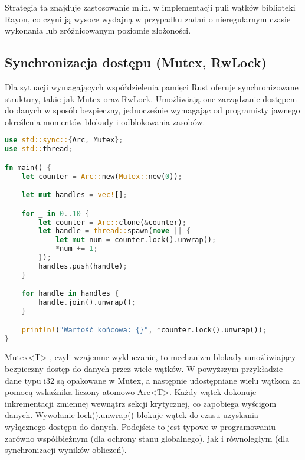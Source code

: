 Strategia ta znajduje zastosowanie m.in. w implementacji puli wątków biblioteki Rayon, co czyni ją wysoce wydajną w przypadku zadań o nieregularnym czasie wykonania lub zróżnicowanym poziomie złożoności.

\subsection{Synchronizacja dostępu (Mutex, RwLock)}
Dla sytuacji wymagających współdzielenia pamięci Rust oferuje synchronizowane struktury, takie jak Mutex  oraz RwLock. Umożliwiają one zarządzanie dostępem do danych w sposób bezpieczny, jednocześnie wymagając od programisty jawnego określenia momentów blokady i odblokowania zasobów.

\begin{lstlisting}[language=Rust, caption=Przykład użycia Mutex, label=mutex_example]
use std::sync::{Arc, Mutex};
use std::thread;

fn main() {
    let counter = Arc::new(Mutex::new(0));

    let mut handles = vec![];

    for _ in 0..10 {
        let counter = Arc::clone(&counter);
        let handle = thread::spawn(move || {
            let mut num = counter.lock().unwrap();
            *num += 1;
        });
        handles.push(handle);
    }

    for handle in handles {
        handle.join().unwrap();
    }

    println!("Wartość końcowa: {}", *counter.lock().unwrap());
}
\end{lstlisting}
Mutex<T> , czyli wzajemne wykluczanie, to mechanizm blokady umożliwiający bezpieczny dostęp do danych przez wiele wątków. W powyższym przykładzie dane typu i32 są opakowane w Mutex, a następnie udostępniane wielu wątkom za pomocą wskaźnika liczony atomowo Arc<T>. Każdy wątek dokonuje inkrementacji zmiennej wewnątrz sekcji krytycznej, co zapobiega wyścigom danych. Wywołanie lock().unwrap() blokuje wątek do czasu uzyskania wyłącznego dostępu do danych. Podejście to jest typowe w programowaniu zarówno współbieżnym (dla ochrony stanu globalnego), jak i równoległym (dla synchronizacji wyników obliczeń). 

